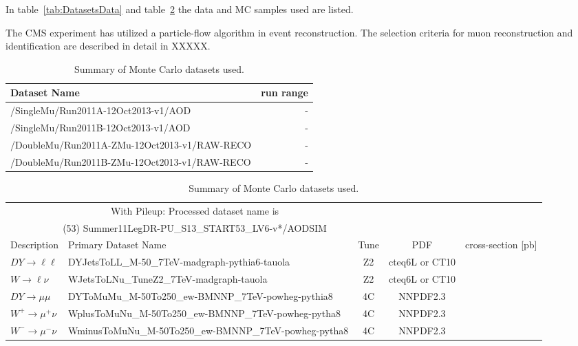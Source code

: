 \documentclass[41pt,a4paper,oneside]{report}
\begin{document}
In table~\ref{tab:DatasetsData} and table~\ref{tab:DatasetsMC} the data and MC samples used are listed.

The CMS experiment has utilized a particle-flow algorithm in event reconstruction.
The selection criteria for muon reconstruction and identification are described in detail in XXXXX.
{\color{magenta}{Add muon event selection}}
{\color{magenta}{Add W and Z event selection}}


\begin{table}[!ht]
\begin{center}
\begin{tabular}{l|r}
\hline
Dataset Name & run range \\
\hline
\hline

  /SingleMu/Run2011A-12Oct2013-v1/AOD & -  \\
  /SingleMu/Run2011B-12Oct2013-v1/AOD & -  \\
  /DoubleMu/Run2011A-ZMu-12Oct2013-v1/RAW-RECO & -  \\
  /DoubleMu/Run2011B-ZMu-12Oct2013-v1/RAW-RECO & -  \\

\hline
\end{tabular}
\caption{Summary of data datasets used.\label{tab:DatasetsData}}
\end{center}
\begin{center}
{\footnotesize
\begin{tabular}{l|l|c|c|c|}
\hline
\multicolumn{3}{c}{With Pileup: Processed dataset name is} \\
\multicolumn{3}{c}{(53) Summer11LegDR-PU\_S13\_START53\_LV6-v*/AODSIM} \\
\hline
 Description                     &   Primary Dataset Name   & Tune & PDF & cross-section [pb]\\
\hline
$ DY \rightarrow \ell \ell$  & DYJetsToLL\_M-50\_7TeV-madgraph-pythia6-tauola & Z2 & cteq6L or CT10 &  \\
$ W \rightarrow \ell \nu$ & WJetsToLNu\_TuneZ2\_7TeV-madgraph-tauola & Z2 & cteq6L or CT10 &  \\
$ DY \rightarrow \mu \mu$  &  DYToMuMu\_M-50To250\_ew-BMNNP\_7TeV-powheg-pythia8 & 4C & NNPDF2.3 &  \\
$ W^{+} \rightarrow \mu^{+} \nu$ &  WplusToMuNu\_M-50To250\_ew-BMNNP\_7TeV-powheg-pytha8 & 4C & NNPDF2.3 & \\
$ W^{-} \rightarrow \mu^{-} \nu$ & WminusToMuNu\_M-50To250\_ew-BMNNP\_7TeV-powheg-pytha8 & 4C & NNPDF2.3 & \\
\hline
\end{tabular}
}
\caption{Summary of Monte Carlo datasets used.
\label{tab:DatasetsMC}}
\end{center}
\end{table}
\end{document}
